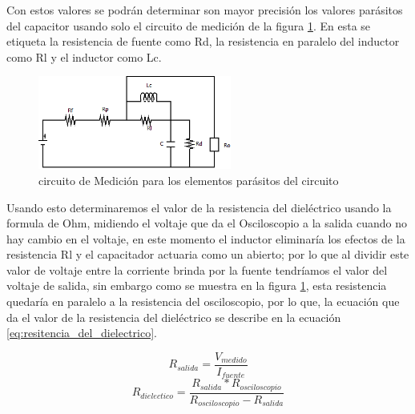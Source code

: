 \documentclass[journal]{IEEEtran}
\begin{document}
  Con estos valores se podrán determinar son mayor precisión los valores parásitos del capacitor usando solo el circuito de medición de la figura \ref{fig:Medicion_de_medicion}. En esta se etiqueta la resistencia de fuente como Rd, la resistencia en paralelo del inductor como Rl y el inductor como Lc.
  
  \begin{figure}
  	\centering
  	\includegraphics[width=2.5in]{img/Circuito_de_medicion}
  	\caption{circuito de Medición para los elementos parásitos del circuito}
  	\label{fig:Medicion_de_medicion}
  \end{figure}
  
  Usando esto determinaremos el valor de la resistencia del dieléctrico usando la formula de Ohm, midiendo el voltaje que da el Osciloscopio a la salida cuando no hay cambio en el voltaje, en este momento el inductor eliminaría los efectos de la resistencia Rl y el capacitador actuaria como un abierto; por lo que al dividir este valor de voltaje entre la corriente brinda por la fuente tendríamos el valor del voltaje de salida, sin embargo como se muestra en la figura \ref{fig:Medicion_de_medicion}, esta resistencia quedaría en paralelo a la resistencia del osciloscopio, por lo que, la ecuación que da el valor de la resistencia del dieléctrico se describe en la ecuación \ref{eq:resitencia_del_dielectrico}.
  
  \[R_{salida}=\frac{V_{medido}}{I_{fuente}}\]
  \begin{equation}
  \label{eq:resitencia_del_dielectrico}
  R_{dielectico}=\frac{R_{salida}*R_{osciloscopio}}{R_{osciloscopio}-R_{salida}}
  \end{equation}
  
\end{document}
